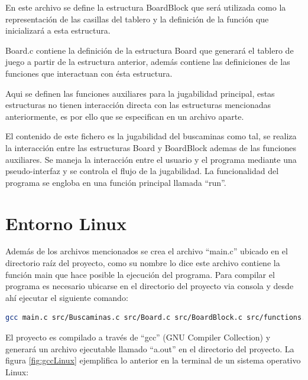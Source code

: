 \documentclass[letterpaper,12pt]{report}
\begin{document}
\begin{description}[align=left]

\item [BoardBlock.c:] 
    En este archivo se define la estructura BoardBlock que será utilizada como la representación de las casillas del tablero y la definición de la función que inicializará a esta estructura. 

\item [Board.c:]
    Board.c contiene la definición de la estructura Board que generará el tablero de juego a partir de la estructura anterior, además contiene las definiciones de las funciones que interactuan con ésta estructura.

\item [functions.c:]
    Aqui se definen las funciones auxiliares para la jugabilidad principal, estas estructuras no tienen interacción directa con las estructuras mencionadas anteriormente, es por ello que se especifican en un archivo aparte.

\item [Buscaminas.c:]
    El contenido de este fichero es la jugabilidad del buscaminas como tal, se realiza la interacción entre las estructuras Board y BoardBlock ademas de las funciones auxiliares. Se maneja la interacción entre el usuario y el programa mediante una pseudo-interfaz y se controla el flujo de la jugabilidad. La funcionalidad del programa se engloba en una función principal llamada ``run''.

\end{description}

\section {Entorno Linux}

Además de los archivos mencionados se crea el archivo ``main.c'' ubicado en el directorio raíz del proyecto, como su nombre lo dice este archivo contiene la función main que hace posible la ejecución del programa. Para compilar el programa es necesario ubicarse en el directorio del proyecto via consola y desde ahí ejecutar el siguiente comando: 

\begin{lstlisting}[language=bash]
gcc main.c src/Buscaminas.c src/Board.c src/BoardBlock.c src/functions.c
\end{lstlisting}

El proyecto es compilado a través de ``gcc'' (GNU Compiler Collection) y generará un archivo ejecutable llamado ``a.out'' en el directorio del proyecto. La figura \ref{fig:gccLinux} ejemplifica lo anterior en la terminal de un sistema operativo Linux:
\end{document}
